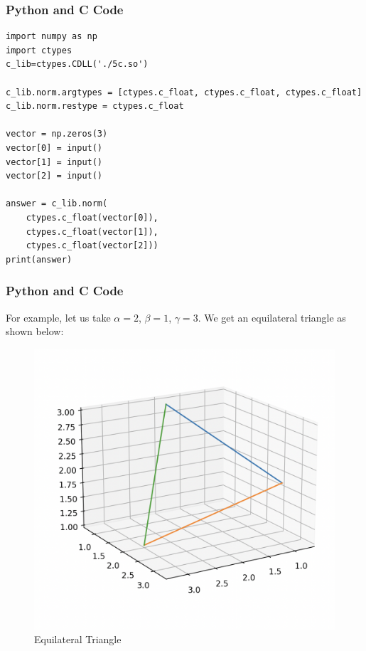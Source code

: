 \documentclass{beamer}
\begin{document}
\begin{frame}[fragile]
\frametitle{Python and C Code}
\begin{lstlisting}
import numpy as np
import ctypes
c_lib=ctypes.CDLL('./5c.so')

c_lib.norm.argtypes = [ctypes.c_float, ctypes.c_float, ctypes.c_float]
c_lib.norm.restype = ctypes.c_float

vector = np.zeros(3)
vector[0] = input()
vector[1] = input()
vector[2] = input()

answer = c_lib.norm(
    ctypes.c_float(vector[0]),
    ctypes.c_float(vector[1]), 
    ctypes.c_float(vector[2]))
print(answer)
\end{lstlisting}

\end{frame}

\begin{frame}[fragile]
\frametitle{Python and C Code}

For example, let us take $\alpha = 2$, $\beta = 1$, $\gamma = 3$.
We get an equilateral triangle as shown below:

\begin{figure}[H]
    \centering
    \includegraphics[width=0.6\columnwidth]{Figs/Example.png}
    \caption{Equilateral Triangle}
    \label{fig:placeholder}
\end{figure}

\end{frame}
\end{document}
